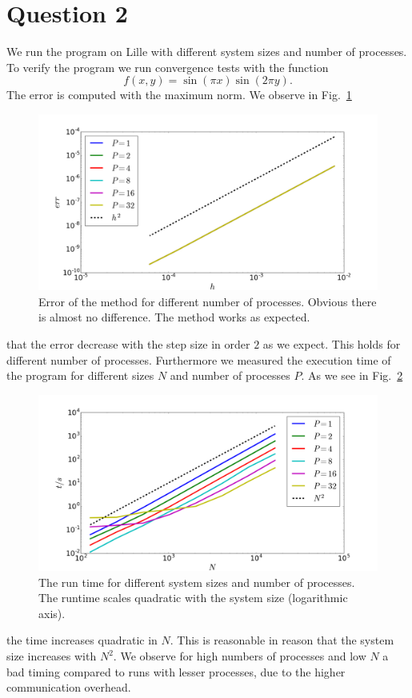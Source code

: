 \section*{Question 2}

We run the program on Lille with different system sizes and number of processes. To verify the program we run convergence tests with the function 
\begin{equation}
	f(x,y) = \sin(\pi x)\sin(2 \pi y).
\end{equation}
The error is computed with the maximum norm. We observe in Fig.~\ref{fig:size_err}\begin{figure}[h] 
  \centering
     \includegraphics[width=\textwidth]{pic/size_err.png}
  \caption{Error of the method for different number of processes. Obvious there is almost no difference. The method works as expected.}
  \label{fig:size_err}
\end{figure} that the error decrease with the step size in order $2$ as we expect. This holds for different number of processes. Furthermore we measured the execution time of the program for different sizes $N$ and number of processes $P$. As we see in Fig.~\ref{fig:size_time}\begin{figure}[h] 
  \centering
     \includegraphics[width=\textwidth]{pic/size_time.png}
  \caption{The run time for different system sizes and number of processes. The runtime scales quadratic with the system size (logarithmic axis).}
  \label{fig:size_time}
\end{figure} the time increases quadratic in $N$. This is reasonable in reason that the system size increases with $N^2$. We observe for high numbers of processes and low $N$ a bad timing compared to runs with lesser processes, due to the higher communication overhead. 


